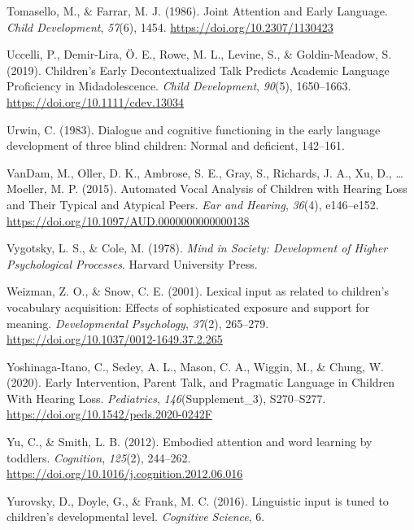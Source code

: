 \documentclass[
  man,floatsintext]{apa6}
\newlength{\cslhangindent}
\newlength{\cslentryspacingunit} %
\newenvironment{CSLReferences}[2] %
 {%
  \setlength{\parindent}{0pt}
  \ifodd #1
  \let\oldpar\par
  \def\par{\hangindent=\cslhangindent\oldpar}
  \fi
  \setlength{\parskip}{#2\cslentryspacingunit}
 }%
 {}
\begin{document}
\begin{CSLReferences}{1}{0}
\leavevmode{}%
Tomasello, M., \& Farrar, M. J. (1986). Joint {Attention} and {Early Language}. \emph{Child Development}, \emph{57}(6), 1454. \url{https://doi.org/10.2307/1130423}

\leavevmode{}%
Uccelli, P., Demir-Lira, Ö. E., Rowe, M. L., Levine, S., \& Goldin-Meadow, S. (2019). Children's {Early Decontextualized Talk Predicts Academic Language Proficiency} in {Midadolescence}. \emph{Child Development}, \emph{90}(5), 1650--1663. \url{https://doi.org/10.1111/cdev.13034}

\leavevmode{}%
Urwin, C. (1983). Dialogue and cognitive functioning in the early language development of three blind children: {Normal} and deficient, 142--161.

\leavevmode{}%
VanDam, M., Oller, D. K., Ambrose, S. E., Gray, S., Richards, J. A., Xu, D., \ldots{} Moeller, M. P. (2015). Automated {Vocal Analysis} of {Children} with {Hearing Loss} and {Their Typical} and {Atypical Peers}. \emph{Ear and Hearing}, \emph{36}(4), e146--e152. \url{https://doi.org/10.1097/AUD.0000000000000138}

\leavevmode{}%
Vygotsky, L. S., \& Cole, M. (1978). \emph{Mind in {Society}: {Development} of {Higher Psychological Processes}}. {Harvard University Press}.

\leavevmode{}%
Weizman, Z. O., \& Snow, C. E. (2001). Lexical input as related to children's vocabulary acquisition: Effects of sophisticated exposure and support for meaning. \emph{Developmental Psychology}, \emph{37}(2), 265--279. \url{https://doi.org/10.1037/0012-1649.37.2.265}

\leavevmode{}%
Yoshinaga-Itano, C., Sedey, A. L., Mason, C. A., Wiggin, M., \& Chung, W. (2020). Early {Intervention}, {Parent Talk}, and {Pragmatic Language} in {Children With Hearing Loss}. \emph{Pediatrics}, \emph{146}(Supplement\_3), S270--S277. \url{https://doi.org/10.1542/peds.2020-0242F}

\leavevmode{}%
Yu, C., \& Smith, L. B. (2012). Embodied attention and word learning by toddlers. \emph{Cognition}, \emph{125}(2), 244--262. \url{https://doi.org/10.1016/j.cognition.2012.06.016}

\leavevmode{}%
Yurovsky, D., Doyle, G., \& Frank, M. C. (2016). Linguistic input is tuned to children's developmental level. \emph{Cognitive Science}, 6.

\end{CSLReferences}
\end{document}
